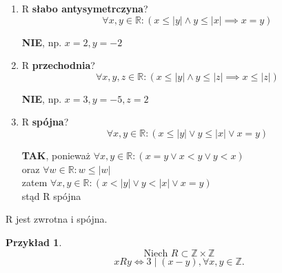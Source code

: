 \documentclass[a5paper,8pt]{article}
\theoremstyle{mythmstyle}
\newtheorem*{example}{Przykład}
\begin{document}
\begin{enumerate}
                \item R \textbf{słabo antysymetrczyna}?
                    \begin{equation*}
                        \forall x, y \in \mathbb{R}: ( x \leq |y| \wedge y \leq |x| \implies x = y )
                    \end{equation*}
                    \begin{center}
                        \textbf{NIE}, np. $ x = 2, y = -2 $
                    \end{center}

                \item R \textbf{przechodnia}?
                    \begin{equation*}
                        \forall x, y, z \in \mathbb{R}: ( x \leq |y| \wedge y \leq |z| \implies x \leq |z| )
                    \end{equation*}
                    \begin{center}
                        \textbf{NIE}, np. $ x = 3, y = -5, z = 2 $
                    \end{center}

                \item R \textbf{spójna}?
                    \begin{equation*}
                        \forall x, y \in \mathbb{R}: ( x \leq |y| \vee y \leq |x| \vee x = y )
                    \end{equation*}
                    \begin{center}
                        \textbf{TAK}, ponieważ $ \forall x, y \in \mathbb{R} : ( x = y \vee x < y \vee y < x ) $\\
                        oraz $ \forall w \in \mathbb{R} : w \leq |w| $\\
                        zatem $ \forall x, y \in \mathbb{R}: ( x < |y| \vee y < |x| \vee x = y ) $ \\
                        stąd R spójna
                    \end{center}
            \end{enumerate}
            R jest zwrotna i spójna.

            \pagebreak
            \begin{example}
                \begin{equation*}
                    \text{Niech   } R \subset \mathbb{Z} \times \mathbb{Z}
                \end{equation*}
                \begin{equation*}
                    x R y \iff 3 \mid (x - y), \forall x, y \in \mathbb{Z}.
                \end{equation*}
            \end{example}
\end{document}
